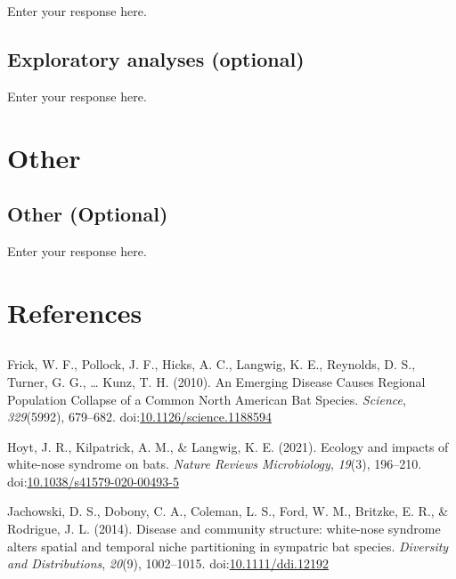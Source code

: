 \documentclass[]{article}
\begin{document}
Enter your response here.

\hypertarget{exploratory-analyses-optional}{%
\subsection{Exploratory analyses
(optional)}\label{exploratory-analyses-optional}}

Enter your response here.

\hypertarget{other}{%
\section{Other}\label{other}}

\hypertarget{other-optional}{%
\subsection{Other (Optional)}\label{other-optional}}

Enter your response here.

\hypertarget{references}{%
\section{References}\label{references}}

\hypertarget{section}{%
\subsection{}\label{section}}

\vspace{-2pc}
\setlength{\parindent}{-0.5in}
\setlength{\leftskip}{-1in}
\setlength{\parskip}{8pt}

\noindent

\hypertarget{refs}{}
\begin{CSLReferences}{1}{0}
\leavevmode\hypertarget{ref-frick2010a}{}%
Frick, W. F., Pollock, J. F., Hicks, A. C., Langwig, K. E., Reynolds, D.
S., Turner, G. G., \ldots{} Kunz, T. H. (2010). An Emerging Disease
Causes Regional Population Collapse of a Common North American Bat
Species. \emph{Science}, \emph{329}(5992), 679--682.
doi:\href{https://doi.org/10.1126/science.1188594}{10.1126/science.1188594}

\leavevmode\hypertarget{ref-hoyt2021}{}%
Hoyt, J. R., Kilpatrick, A. M., \& Langwig, K. E. (2021). Ecology and
impacts of white-nose syndrome on bats. \emph{Nature Reviews
Microbiology}, \emph{19}(3), 196--210.
doi:\href{https://doi.org/10.1038/s41579-020-00493-5}{10.1038/s41579-020-00493-5}

\leavevmode\hypertarget{ref-jachowski2014}{}%
Jachowski, D. S., Dobony, C. A., Coleman, L. S., Ford, W. M., Britzke,
E. R., \& Rodrigue, J. L. (2014). Disease and community structure:
white-nose syndrome alters spatial and temporal niche partitioning in
sympatric bat species. \emph{Diversity and Distributions}, \emph{20}(9),
1002--1015.
doi:\href{https://doi.org/10.1111/ddi.12192}{10.1111/ddi.12192}

\end{CSLReferences}
\end{document}
